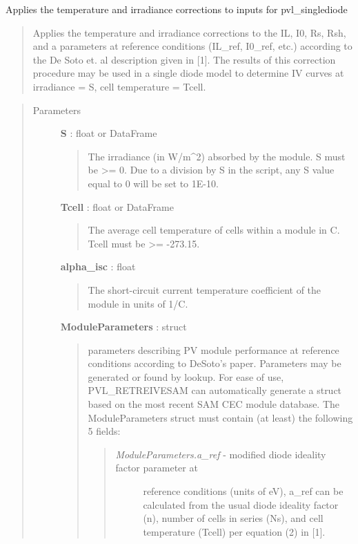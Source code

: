 \documentclass[letterpaper,10pt,english]{sphinxmanual}
\begin{document}
\begin{fulllineitems}
\label{stubs/pvlib.pvl_calcparams_desoto:pvlib.pvl_calcparams_desoto}
Applies the temperature and irradiance corrections to inputs for pvl\_singlediode
\begin{quote}

Applies the temperature and irradiance corrections to the IL, I0, 
Rs, Rsh, and a parameters at reference conditions (IL\_ref, I0\_ref,
etc.) according to the De Soto et. al description given in {[}1{]}. The
results of this correction procedure may be used in a single diode
model to determine IV curves at irradiance = S, cell temperature =
Tcell.
\end{quote}
\begin{quote}\begin{description}
\item[{Parameters}] \leavevmode
\textbf{S} : float or DataFrame
\begin{quote}

The irradiance (in W/m\textasciicircum{}2) absorbed by the module. S must be \textgreater{}= 0.
Due to a division by S in the script, any S value equal to 0 will be set to 1E-10.
\end{quote}

\textbf{Tcell} : float or DataFrame
\begin{quote}

The average cell temperature of cells within a module in C.
Tcell must be \textgreater{}= -273.15.
\end{quote}

\textbf{alpha\_isc} : float
\begin{quote}

The short-circuit current temperature coefficient of the module in units of 1/C.
\end{quote}

\textbf{ModuleParameters} : struct
\begin{quote}

parameters describing PV module performance at reference conditions according 
to DeSoto's paper. Parameters may be generated or found by lookup. For ease of use, 
PVL\_RETREIVESAM can automatically generate a struct based on the most recent SAM CEC module 
database. The ModuleParameters struct must contain (at least) the 
following 5 fields:
\begin{quote}
\begin{description}
\item[{\emph{ModuleParameters.a\_ref} - modified diode ideality factor parameter at}] \leavevmode
reference conditions (units of eV), a\_ref can be calculated from the
usual diode ideality factor (n), number of cells in series (Ns),
and cell temperature (Tcell) per equation (2) in {[}1{]}.


\end{description}
\end{quote}
\end{quote}
\end{description}
\end{quote}
\end{fulllineitems}
\end{document}
